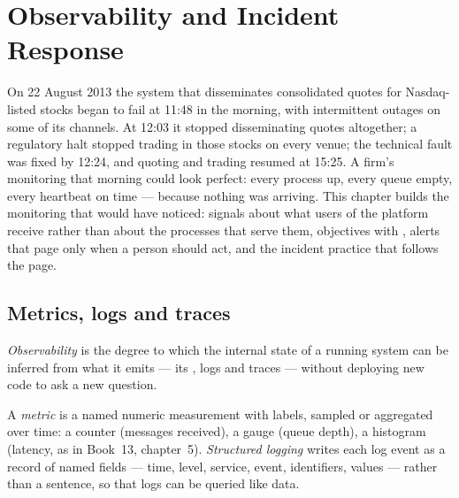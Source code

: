 \chapter{Observability and Incident Response}\label{ch:pl:observability-and-incident-response}

On 22 August 2013 the system that disseminates consolidated quotes for Nasdaq-listed stocks began to fail at 11:48 in the morning, with
intermittent outages on some of its channels. At 12:03 it stopped disseminating quotes altogether; a regulatory halt stopped trading in those
stocks on every venue; the technical fault was fixed by 12:24, and quoting and trading resumed at 15:25. A firm's monitoring that morning
could look perfect: every process up, every queue empty, every heartbeat on time --- because nothing was arriving. This chapter builds the
monitoring that would have noticed: signals about what users of the platform receive rather than about the processes that serve them,
objectives with , alerts that page only when a person should act, and the incident practice that follows the page.

\section{Metrics, logs and traces}

\begin{definition}[Observability]\label{def:pl:observability-and-incident-response:observability}
\emph{Observability} is the degree to which the internal state of a running system can be inferred from what it
emits --- its , logs and traces --- without deploying new code to ask a new question.
\end{definition}

\begin{definition}\label{def:pl:observability-and-incident-response:metric}
A \emph{metric} is a named numeric measurement with labels, sampled or aggregated over time: a counter (messages received), a
gauge (queue depth), a histogram (latency, as in Book~13, chapter~5). \emph{Structured logging} writes each log event
as a record of named fields --- time, level, service, event, identifiers, values --- rather than a sentence, so that logs can be queried like
data.
\end{definition}


